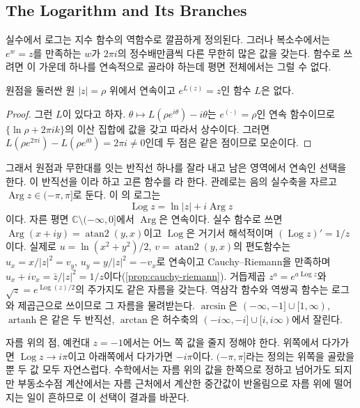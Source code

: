 \subsection{The Logarithm and Its Branches}

실수에서 로그는 지수 함수의 역함수로 깔끔하게 정의된다. 그러나 복소수에서는 $e^w=z$를 만족하는 $w$가 $2\pi i$의 정수배만큼씩 다른 무한히 많은 값을 갖는다. 함수로 쓰려면 이 가운데 하나를 연속적으로 골라야 하는데 평면 전체에서는 그럴 수 없다.

\begin{proposition}
\label{prop:no-global-log}
원점을 둘러싼 원 $|z|=\rho$ 위에서 연속이고 $e^{L(z)}=z$인 함수 $L$은 없다.
\end{proposition}

\begin{proof}
그런 $L$이 있다고 하자. $\theta\mapsto L(\rho e^{i\theta})-i\theta$는 $e^{(\cdot)}=\rho$인 연속 함수이므로 $\{\ln\rho+2\pi ik\}$의 이산 집합에 값을 갖고 따라서 상수이다. 그러면 $L(\rho e^{2\pi i})-L(\rho e^{i0})=2\pi i\ne0$인데 두 점은 같은 점이므로 모순이다.
\end{proof}

그래서 원점과 무한대를 잇는 반직선 하나를 잘라 내고 남은 영역에서 연속인 선택을 한다. 이 반직선을 이라 하고 고른 함수를 라 한다. 관례로는 음의 실수축을 자르고 $\operatorname{Arg}z\in(-\pi,\pi]$로 둔다. 이 의 로그는
\[
\operatorname{Log}z=\ln|z|+i\operatorname{Arg}z
\]
이다. 자른 평면 $\mathbb C\setminus(-\infty,0]$에서 $\operatorname{Arg}$은 연속이다. 실수 함수로 쓰면 $\operatorname{Arg}(x+iy)=\operatorname{atan2}(y,x)$이고 $\operatorname{Log}$은 거기서 해석적이며 $(\operatorname{Log}z)'=1/z$이다. 실제로 $u=\ln(x^2+y^2)/2$, $v=\operatorname{atan2}(y,x)$의 편도함수는 $u_x=x/|z|^2=v_y$, $u_y=y/|z|^2=-v_x$로 연속이고 Cauchy--Riemann을 만족하며 $u_x+iv_x=\bar z/|z|^2=1/z$이다(\cref{prop:cauchy-riemann}). 거듭제곱 $z^a=e^{a\operatorname{Log}z}$와 $\sqrt z=e^{\operatorname{Log}(z)/2}$의 주가지도 같은 자름을 갖는다. 역삼각 함수와 역쌍곡 함수는 로그와 제곱근으로 쓰이므로 그 자름을 물려받는다. $\arcsin$은 $(-\infty,-1]\cup[1,\infty)$, $\operatorname{artanh}$은 같은 두 반직선, $\arctan$은 허수축의 $(-i\infty,-i]\cup[i,i\infty)$에서 잘린다.

자름 위의 점, 예컨대 $z=-1$에서는 어느 쪽 값을 줄지 정해야 한다. 위쪽에서 다가가면 $\operatorname{Log}z\to i\pi$이고 아래쪽에서 다가가면 $-i\pi$이다. $(-\pi,\pi]$라는 정의는 위쪽을 골랐을 뿐 두 값 모두 자연스럽다. 수학에서는 자름 위의 값을 한쪽으로 정하고 넘어가도 되지만 부동소수점 계산에서는 자름 근처에서 계산한 중간값이 반올림으로 자름 위에 떨어지는 일이 흔하므로 이 선택이 결과를 바꾼다.

